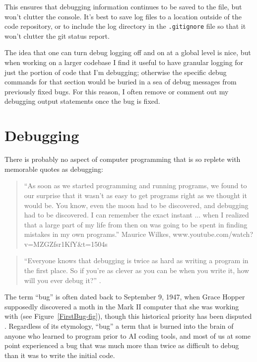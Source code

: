 This ensures that debugging information continues to be saved to the file, but won't clutter the console.  It's best to save log files to a location outside of the code repository, or to include the log directory in the \texttt{.gitignore} file so that it won't clutter the git status report.

The idea that one can turn debug logging off and on at a global level is nice, but when working on a larger codebase I find it useful to have granular logging for just the portion of code that I'm debugging; otherwise the specific debug commands for that section would be buried in a sea of debug messages from previously fixed bugs.  For this reason, I often remove or comment out my debugging output statements once the bug is fixed.

\section{Debugging}

There is probably no aspect of computer programming that is so replete with memorable quotes as debugging:

\begin{quote}
``As soon as we started programming and running programs, we found to our surprise that it wasn't as easy to get programs right as we thought it would be. You know, even the moon had to be discovered, and debugging had to be discovered. I can remember the exact instant ... when I realized that a large part of my life from then on was going to be spent in finding mistakes in my own programs.'' Maurice Wilkes, www.youtube.com/watch?v=MZGZfsr1KfY\&t=1504s
\end{quote}

\begin{quote}
``Everyone knows that debugging is twice as hard as writing a program in the first place. So if you're as clever as you can be when you write it, how will you ever debug it?'' \citep{Kernighan:1978aa}.
\end{quote}

The term ``bug'' is often dated back to September 9, 1947, when Grace Hopper supposedly discovered a moth in the Mark II computer that she was working with (see Figure~\ref{FirstBug-fig}), though this historical priority has been disputed \citep{Shapiro:1987aa}. Regardless of its etymology, ``bug'' a term that is burned into the brain of anyone who learned to program prior to AI coding tools, and most of us at some point experienced a bug that was much more than twice as difficult to debug than it was to write the initial code.


